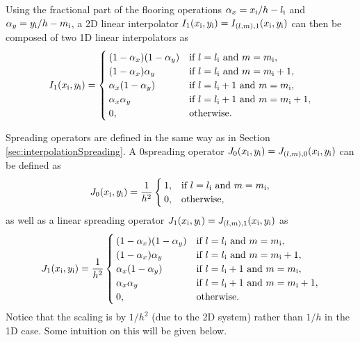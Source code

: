 Using the fractional part of the flooring operations $\alpha_x = x_{\text{i}}/h - l_{\text{i}}$ and $\alpha_y= y_{\text{i}}/h - m_{\text{i}}$, a 2D linear interpolator  $I_1(x_{\text{i}}, y_{\text{i}}) = I_{(l, m), 1}(x_{\text{i}}, y_{\text{i}})$ can then be composed of two 1D linear interpolators as
\begin{equation}
    I_1(x_{\text{i}}, y_{\text{i}}) = \begin{cases}
        (1 - \alpha_x)(1 - \alpha_y)& \text{if } l = l_{\text{i}} \text{ and } m = m_{\text{i}}, \\
        (1 - \alpha_x)\alpha_y& \text{if } l = l_{\text{i}} \text{ and } m = m_{\text{i}} + 1, \\
        \alpha_x(1 - \alpha_y)& \text{if } l = l_{\text{i}} + 1 \text{ and } m = m_{\text{i}}, \\
        \alpha_x\alpha_y& \text{if } l = l_{\text{i}}+1 \text{ and } m = m_{\text{i}}+1, \\
        0, & \text{otherwise}.
    \end{cases}
\end{equation}

Spreading operators are defined in the same way as in Section \ref{sec:interpolationSpreading}. A $0$\thOrder spreading operator $J_0(x_{\text{i}}, y_{\text{i}}) = J_{(l,m),0}(x_{\text{i}}, y_{\text{i}})$ can be defined as
\begin{equation}
    J_0(x_{\text{i}}, y_{\text{i}}) = \frac{1}{h^2}\begin{cases}
        1, & \text{if } l = l_{\text{i}} \text{ and } m = m_{\text{i}},\\
        0, & \text{otherwise},
    \end{cases}
\end{equation}
as well as a linear spreading operator $J_1(x_{\text{i}}, y_{\text{i}}) = J_{(l,m),1}(x_{\text{i}}, y_{\text{i}})$ as
\begin{equation}
    J_1(x_{\text{i}}, y_{\text{i}}) = \frac{1}{h^2}\begin{cases}
        (1 - \alpha_x)(1 - \alpha_y)& \text{if } l = l_{\text{i}} \text{ and } m = m_{\text{i}}, \\
        (1 - \alpha_x)\alpha_y& \text{if } l = l_{\text{i}} \text{ and } m = m_{\text{i}} + 1, \\
        \alpha_x(1 - \alpha_y)& \text{if } l = l_{\text{i}} + 1 \text{ and } m = m_{\text{i}}, \\
        \alpha_x\alpha_y& \text{if } l = l_{\text{i}}+1 \text{ and } m = m_{\text{i}}+1, \\
        0, & \text{otherwise}.
    \end{cases}
\end{equation}
Notice that the scaling is by $1/h^2$ (due to the 2D system) rather than $1/h$ in the 1D case. Some intuition on this will be given below. 

